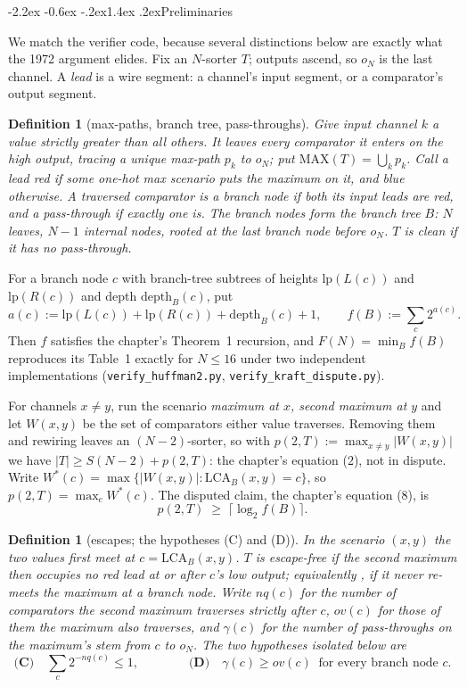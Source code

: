 \documentclass[11pt,a4paper]{article}
\makeatletter
\renewcommand\section{\@startsection{section}{1}{\z@}%
  {-2.2ex \@plus -0.6ex \@minus -.2ex}{1.4ex \@plus.2ex}{\normalfont\large\bfseries}}
\newtheorem{definition}[statement]{Definition}
\newcommand{\MAX}{\mathrm{MAX}}
\newcommand{\LCA}{\mathrm{LCA}}
\newcommand{\lb}{\mathrm{lp}}
\makeatother
\begin{document}
\section{Preliminaries}
\label{sec:prelim}

We match the verifier code, because several distinctions below are exactly what
the 1972 argument elides. Fix an $N$-sorter $T$; outputs ascend, so $o_N$ is the
last channel. A \emph{lead} is a wire segment: a channel's input segment, or a
comparator's output segment.

\begin{definition}[max-paths, branch tree, pass-throughs]
\label{def:one}
Give input channel $k$ a value strictly greater than all others. It leaves
every comparator it enters on the high output, tracing a unique \emph{max-path}
$p_k$ to $o_N$; put $\MAX(T) = \bigcup_k p_k$. Call a lead \emph{red} if some
one-hot max scenario puts the maximum on it, and \emph{blue} otherwise. A
traversed comparator is a \emph{branch node} if both its input leads are red,
and a \emph{pass-through} if exactly one is. The branch nodes form the
\emph{branch tree} $B$: $N$ leaves, $N-1$ internal nodes, rooted at the last
branch node before $o_N$. $T$ is \emph{clean} if it has no pass-through.
\end{definition}

For a branch node $c$ with branch-tree subtrees of heights $\lb(L(c))$ and
$\lb(R(c))$ and depth $\mathrm{depth}_B(c)$, put
\[
  a(c) := \lb(L(c)) + \lb(R(c)) + \mathrm{depth}_B(c) + 1,
  \qquad
  f(B) := \sum_{c} 2^{a(c)} .
\]
Then $f$ satisfies the chapter's Theorem~1 recursion, and $F(N) = \min_B f(B)$
reproduces its Table~1 exactly for $N \le 16$ under two independent
implementations (\texttt{verify\_huffman2.py},
\texttt{verify\_kraft\_dispute.py}).

For channels $x \ne y$, run the scenario \emph{maximum at $x$, second maximum at
$y$} and let $W(x,y)$ be the set of comparators either value traverses. Removing
them and rewiring leaves an $(N-2)$-sorter, so with
$p(2,T) := \max_{x \ne y} |W(x,y)|$ we have $|T| \ge S(N-2) + p(2,T)$: the
chapter's equation (2), not in dispute. Write
$W^*(c) = \max\{|W(x,y)| : \LCA_B(x,y) = c\}$, so
$p(2,T) = \max_c W^*(c)$. The disputed claim, the chapter's equation (8), is
\[
  p(2,T) \;\ge\; \lceil \log_2 f(B) \rceil . \tag{8}
\]

\begin{definition}[escapes; the hypotheses (C) and (D)]
\label{def:two}
In the scenario $(x,y)$ the two values first meet at $c = \LCA_B(x,y)$. $T$ is
\emph{escape-free} if the second maximum then occupies no red lead at or after
$c$'s low output; equivalently \cite{Art}, if it never re-meets the maximum at a
branch node. Write $nq(c)$ for the number of comparators the second maximum
traverses strictly after $c$, $ov(c)$ for those of them the maximum also
traverses, and $\gamma(c)$ for the number of pass-throughs on the maximum's stem
from $c$ to $o_N$. The two hypotheses isolated below are
\[
  \textbf{(C)}\quad \sum_c 2^{-nq(c)} \le 1,
  \qquad\qquad
  \textbf{(D)}\quad \gamma(c) \ge ov(c) \ \text{ for every branch node } c .
\]
\end{definition}
\end{document}
